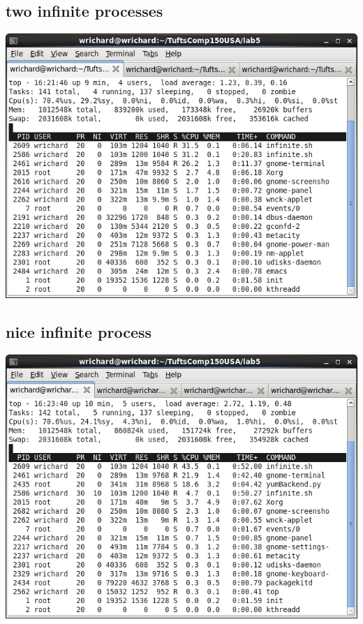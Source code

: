\documentclass[a4paper,10pt]{article}
\begin{document}
\subsection{two infinite processes}
  \begin{center}
  \includegraphics[width=\linewidth]{./top_infinite.png}
  \end{center}
\subsection{nice infinite process}
  \begin{center}
  \includegraphics[width=\linewidth]{./top_nice_infinite.png}
  \end{center}
\end{document}
